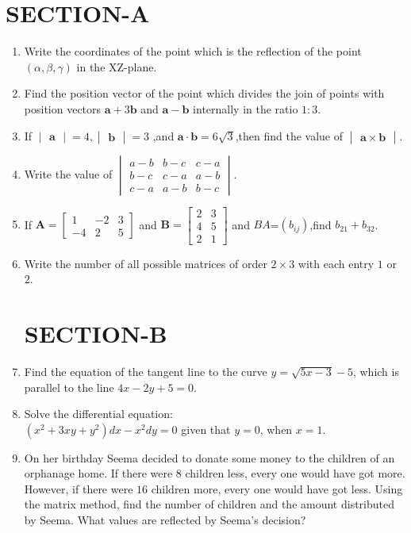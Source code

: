 \documentclass[12pt,-letter paper]{article}
\let\vec\mathbf{}
\let\vec\mathbf{}
\let\vec\mathbf{}
\providecommand{\mydet}[1]{\ensuremath{\begin{vmatrix}#1\end{vmatrix}}}
\providecommand{\myvec}[1]{\ensuremath{\begin{bmatrix}#1\end{bmatrix}}}
\providecommand{\brak}[1]{\ensuremath{\left(#1\right)}}
\begin{document}
\section*{\centering SECTION-A}
\begin{enumerate}
	\item Write the coordinates of the point which is the reflection of the point \brak {\alpha, \beta, \gamma} in the XZ-plane.
    
  \item  Find the position vector of the point which divides the join of points with position vectors $\vec{a}+3\vec{b}$ and $\vec{a}-\vec{b}$ internally in the ratio $1:3$.
    
  \item If $\mydet{\vec{a}} = 4 , \mydet{\vec{b}} = 3$ ,and $\vec{a} \cdot \vec{b}= 6\sqrt{3} $,then find the value of $\mydet{\vec{a} \times \vec{b}}$.
    
    \item Write the value of $\mydet{a-b&b-c&c-a\\b-c&c-a&a-b\\c-a&a-b&b-c}$.
    \item  If $ \vec{A} =\myvec{ 1 & -2 & 3 \\-4 & 2 & 5}$ and $ \vec{B}=\myvec{2&3\\4&5\\2&1}$ and  $BA$=$\brak{b_{ij}}$,find $b_{21}+b_{32}$.
    \item Write the number of all possible matrices of order $2 \times 3$  with each entry $1$ or $2$.

\section*{\centering SECTION-B}    
  \item  Find the equation of the tangent line to the curve $ y = \sqrt{5x - 3} - 5 $, which is parallel to the line $ 4x - 2y + 5 = 0 $.

   \item Solve the differential equation:\\$\brak{x^2+3xy+y^2}dx-x^2dy=0$ given that $y=0$, when $x=1$.

    \item On her birthday Seema decided to donate some money to the children of an orphanage home. If there were $8$ children less, every one would have got  more. However, if there were $16$ children more, every one would have got  less. Using the matrix method, find the number of children and the amount distributed by Seema. What values are reflected by Seema's decision?


\end{enumerate}
\end{document}
